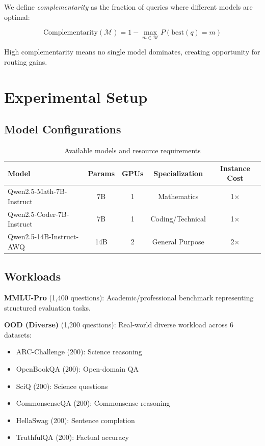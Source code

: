 \documentclass[11pt,a4paper]{article}
\begin{document}
We define \emph{complementarity} as the fraction of queries where different models are optimal:

\begin{equation}
    \text{Complementarity}(\mathcal{M}) = 1 - \max_{m \in \mathcal{M}} P(\text{best}(q) = m)
\end{equation}

High complementarity means no single model dominates, creating opportunity for routing gains.

\section{Experimental Setup}

\subsection{Model Configurations}

\begin{table}[h]
\centering
\caption{Available models and resource requirements}
\label{tab:models}
\begin{tabular}{lcccc}
\toprule
\textbf{Model} & \textbf{Params} & \textbf{GPUs} & \textbf{Specialization} & \textbf{Instance Cost} \\
\midrule
Qwen2.5-Math-7B-Instruct & 7B & 1 & Mathematics & 1$\times$ \\
Qwen2.5-Coder-7B-Instruct & 7B & 1 & Coding/Technical & 1$\times$ \\
Qwen2.5-14B-Instruct-AWQ & 14B & 2 & General Purpose & 2$\times$ \\
\bottomrule
\end{tabular}
\end{table}

\subsection{Workloads}

\textbf{MMLU-Pro} (1,400 questions): Academic/professional benchmark representing structured evaluation tasks.

\textbf{OOD (Diverse)} (1,200 questions): Real-world diverse workload across 6 datasets:
\begin{itemize}
    \item ARC-Challenge (200): Science reasoning
    \item OpenBookQA (200): Open-domain QA
    \item SciQ (200): Science questions  
    \item CommonsenseQA (200): Commonsense reasoning
    \item HellaSwag (200): Sentence completion
    \item TruthfulQA (200): Factual accuracy
\end{itemize}
\end{document}
